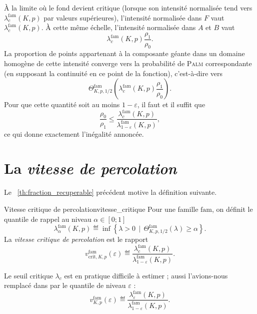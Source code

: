 \begin{Preuve}
À la limite où le fond devient critique (lorsque son intensité normalisée tend vers $\lambda_c^{\mathrm{fam}}(K,p)$ par valeurs supérieures), l'intensité normalisée dans $F$ vaut $\lambda_c^{\mathrm{fam}}(K,p)$. À cette même échelle, l'intensité normalisée dans $A$ et $B$ vaut
\[
    \lambda_c^{\mathrm{fam}}(K,p)\frac{\rho_1}{\rho_0}.
\]
La proportion de points appartenant à la composante géante dans un domaine homogène de cette intensité converge vers la probabilité de \textsc{Palm} correspondante (en supposant la continuité en ce point de la fonction), c'est-à-dire vers
\[
    \Theta^{\mathrm{fam}}_{K,p,1/2}\left(
        \lambda_c^{\mathrm{fam}}(K,p)\frac{\rho_1}{\rho_0}
    \right).
\]
Pour que cette quantité soit au moins $1-\varepsilon$, il faut et il suffit que
\[
    \frac{\rho_0}{\rho_1}
    \le
    \frac{\lambda_c^{\mathrm{fam}}(K,p)}
         {\lambda^{\mathrm{fam}}_{1-\varepsilon}(K,p)},
\]
ce qui donne exactement l'inégalité annoncée.
\end{Preuve}


\section{La \emph{vitesse de percolation}}

Le \Th~\ref{th:fraction_recuperable} précédent motive la définition suivante.

\begin{Definition}{Vitesse critique de percolation}{vitesse_critique}
Pour une famille $\mathrm{fam}$, on définit le quantile de rappel au niveau $\alpha \in [ 0 ; 1]$
\[
    \lambda^{\mathrm{fam}}_{\alpha}(K,p)
    \eqdef
    \inf\left\{
        \lambda>0 \, \mid \,
        \Theta^{\mathrm{fam}}_{K,p,1/2}(\lambda)
        \ge \alpha
    \right\}.
\]
La \emph{vitesse critique de percolation} est le rapport
\[
\boxed{
    v^{\mathrm{fam}}_{\mathrm{crit},K,p}(\varepsilon)
    \eqdef
    \frac{
        \lambda_c^{\mathrm{fam}}(K,p)
    }{
        \lambda^{\mathrm{fam}}_{1-\varepsilon}(K,p)
    }.
    }
\]
\end{Definition}


Le seuil critique $\lambda_c$ est en pratique difficile à estimer ; aussi l'avions-nous remplacé dans \cite{BibiIstambul} par le quantile de niveau $\varepsilon$ :
\begin{equation}
\boxed{
    v^{\mathrm{fam}}_{K,p}(\varepsilon)
    \eqdef
    \frac{
        \lambda_\varepsilon^{\mathrm{fam}}(K,p)
    }{
        \lambda_{1-\varepsilon}^{\mathrm{fam}}(K,p)
    }.
}
\end{equation}


